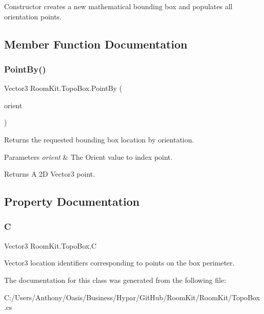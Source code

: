 Constructor creates a new mathematical bounding box and populates all orientation points. 



\subsection{Member Function Documentation}
\mbox{\label{class_room_kit_1_1_topo_box_a48b838c48267cf92b3511c51c12339ce}} 
\subsubsection{\texorpdfstring{Point\+By()}{PointBy()}}
{\footnotesize\ttfamily Vector3 Room\+Kit.\+Topo\+Box.\+Point\+By (\begin{DoxyParamCaption}\item[{\mbox{\hyperlink{namespace_room_kit_a46927f752f7751de2c23e9e644fb508d}{Orient}}}]{orient }\end{DoxyParamCaption})}



Returns the requested bounding box location by orientation. 


\begin{DoxyParams}{Parameters}
{\em orient} & The Orient value to index point.\\
\hline
\end{DoxyParams}
\begin{DoxyReturn}{Returns}
A 2D Vector3 point. 
\end{DoxyReturn}


\subsection{Property Documentation}
\mbox{\label{class_room_kit_1_1_topo_box_a49b90eeff3ec40cba9f66ddfca10b75f}} 
\subsubsection{\texorpdfstring{C}{C}}
{\footnotesize\ttfamily Vector3 Room\+Kit.\+Topo\+Box.\+C\hspace{0.3cm}{\ttfamily [get]}}



Vector3 location identifiers corresponding to points on the box perimeter. 



The documentation for this class was generated from the following file\+:\begin{DoxyCompactItemize}
\item 
C\+:/\+Users/\+Anthony/\+Oasis/\+Business/\+Hypar/\+Git\+Hub/\+Room\+Kit/\+Room\+Kit/Topo\+Box.\+cs\end{DoxyCompactItemize}

